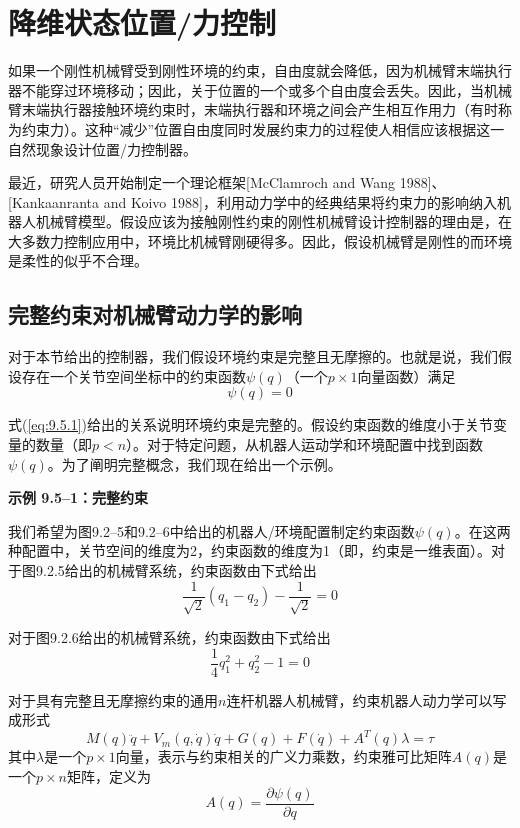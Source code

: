 \documentclass[12pt,a4paper]{ctexart}
\begin{document}
\section{降维状态位置/力控制}\label{sec:9.5}

如果一个刚性机械臂受到刚性环境的约束，自由度就会降低，因为机械臂末端执行器不能穿过环境移动；因此，关于位置的一个或多个自由度会丢失。因此，当机械臂末端执行器接触环境约束时，末端执行器和环境之间会产生相互作用力（有时称为约束力）。这种``减少''位置自由度同时发展约束力的过程使人相信应该根据这一自然现象设计位置/力控制器。

最近，研究人员开始制定一个理论框架[McClamroch and Wang 1988]、[Kankaanranta and Koivo 1988]，利用动力学中的经典结果将约束力的影响纳入机器人机械臂模型。假设应该为接触刚性约束的刚性机械臂设计控制器的理由是，在大多数力控制应用中，环境比机械臂刚硬得多。因此，假设机械臂是刚性的而环境是柔性的似乎不合理。

\subsection{完整约束对机械臂动力学的影响}

对于本节给出的控制器，我们假设环境约束是完整且无摩擦的。也就是说，我们假设存在一个关节空间坐标中的约束函数$\psi(q)$（一个$p \times 1$向量函数）满足
\begin{equation}\label{eq:9.5.1}
\psi(q) = 0
\end{equation}

式(\ref{eq:9.5.1})给出的关系说明环境约束是完整的。假设约束函数的维度小于关节变量的数量（即$p < n$）。对于特定问题，从机器人运动学和环境配置中找到函数$\psi(q)$。为了阐明完整概念，我们现在给出一个示例。

\textbf{示例 9.5--1：完整约束}

我们希望为图9.2--5和9.2--6中给出的机器人/环境配置制定约束函数$\psi(q)$。在这两种配置中，关节空间的维度为2，约束函数的维度为1（即，约束是一维表面）。对于图9.2.5给出的机械臂系统，约束函数由下式给出
\[
\frac{1}{\sqrt{2}}(q_1 - q_2) - \frac{1}{\sqrt{2}} = 0
\]

对于图9.2.6给出的机械臂系统，约束函数由下式给出
\[
\frac{1}{4}q_1^2 + q_2^2 - 1 = 0
\]

对于具有完整且无摩擦约束的通用$n$连杆机器人机械臂，约束机器人动力学可以写成形式
\begin{equation}\label{eq:9.5.2}
M(q)\ddot{q} + V_m(q, \dot{q})\dot{q} + G(q) + F(\dot{q}) + A^T(q)\lambda = \tau
\end{equation}
其中$\lambda$是一个$p \times 1$向量，表示与约束相关的广义力乘数，约束雅可比矩阵$A(q)$是一个$p \times n$矩阵，定义为
\begin{equation}\label{eq:9.5.3}
A(q) = \frac{\partial \psi(q)}{\partial q}
\end{equation}
\end{document}
